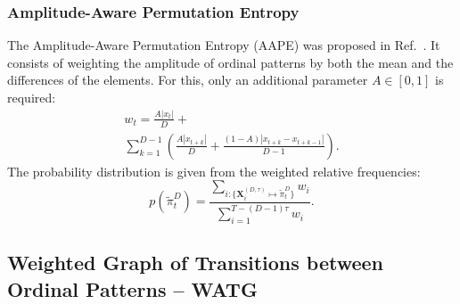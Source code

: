 \documentclass[journal]{IEEEtran}
\begin{document}
\subsubsection{Amplitude-Aware Permutation Entropy}\label{AAPE}

The Amplitude-Aware Permutation Entropy (AAPE) was proposed in Ref.~\cite{azami2016amplitude}.
It consists of weighting the amplitude of ordinal patterns by both the mean and the differences of the elements.
For this, only an additional parameter $ A \in [0, 1]$ is required:
\begin{multline}
w_t = \frac{A  |x_t|}{D} + \\ \sum_{k = 1}^{D - 1} \left(\frac{A  |x_{t + k}|}{D} + \frac{(1 - A)  |x_{t+k} - x_{t+k-1}|}{D - 1}\right).
\end{multline}
The probability distribution is given from the weighted relative frequencies:
\begin{equation}
p(\widetilde \pi_t^D) = \frac{\sum_{i : \{\mathbf{X}^{(D,\tau)}_i \mapsto \widetilde\pi^D_t\}} w_{i}}{\sum_{i = 1}^{T-(D-1)\tau} w_{i}}.
\end{equation}

\subsection{Weighted Graph of Transitions between Ordinal Patterns -- WATG}\label{WATG}

\end{document}
